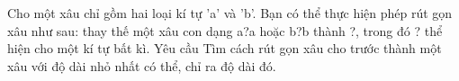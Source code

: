 Cho một xâu chỉ gồm hai loại kí tự 'a' và 'b'. Bạn có thể thực hiện phép rút gọn xâu như sau: thay thế một xâu con dạng a?a hoặc b?b thành ?, trong đó ? thể hiện cho một kí tự bất kì.
Yêu cầu
Tìm cách rút gọn xâu cho trước thành một xâu với độ dài nhỏ nhất có thể, chỉ ra độ dài đó.